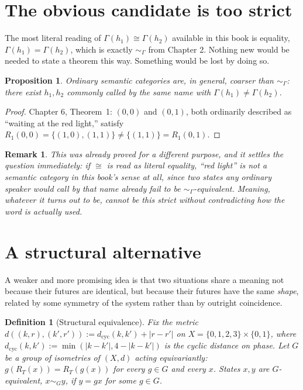 \documentclass[11pt]{report}
\newtheorem{proposition}{Proposition}[chapter]
\newtheorem{definition}{Definition}[chapter]
\newtheorem{remark}{Remark}[chapter]
\begin{document}
\section*{The obvious candidate is too strict}

The most literal reading of $\Gamma(h_1) \cong \Gamma(h_2)$ available
in this book is equality, $\Gamma(h_1) = \Gamma(h_2)$, which is
exactly $\sim_\Gamma$ from Chapter 2. Nothing new would be needed to
state a theorem this way. Something would be lost by doing so.

\begin{proposition}
Ordinary semantic categories are, in general, coarser than
$\sim_\Gamma$: there exist $h_1, h_2$ commonly called by the same
name with $\Gamma(h_1) \neq \Gamma(h_2)$.
\end{proposition}
\begin{proof}
Chapter 6, Theorem~1: $(0,0)$ and $(0,1)$, both ordinarily described
as ``waiting at the red light,'' satisfy $R_1(0,0) = \{(1,0),(1,1)\}
\neq \{(1,1)\} = R_1(0,1)$.
\end{proof}

\begin{remark}
This was already proved for a different purpose, and it settles the
question immediately: if $\cong$ is read as literal equality, ``red
light'' is not a semantic category in this book's sense at all, since
two states any ordinary speaker would call by that name already fail
to be $\sim_\Gamma$-equivalent. Meaning, whatever it turns out to be,
cannot be this strict without contradicting how the word is actually
used.
\end{remark}

\section*{A structural alternative}

A weaker and more promising idea is that two situations share a
meaning not because their futures are identical, but because their
futures have the same \emph{shape}, related by some symmetry of the
system rather than by outright coincidence.

\begin{definition}[Structural equivalence]
Fix the metric $d((k,r),(k',r')) := d_{\mathrm{cyc}}(k,k') + |r-r'|$
on $X = \{0,1,2,3\} \times \{0,1\}$, where $d_{\mathrm{cyc}}(k,k') :=
\min(|k-k'|, 4-|k-k'|)$ is the cyclic distance on phase. Let $G$ be a
group of isometries of $(X,d)$ acting \emph{equivariantly}: $g(R_T(x))
= R_T(g(x))$ for every $g \in G$ and every $x$. States $x,y$ are
$G$-equivalent, $x \sim_G y$, if $y = gx$ for some $g \in G$.
\end{definition}
\end{document}
